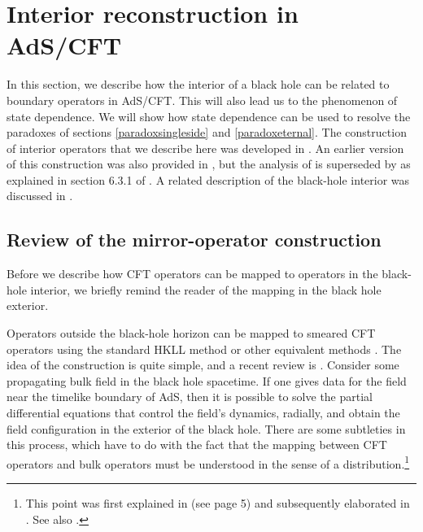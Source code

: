 \documentclass[12pt]{article}
\begin{document}
\section{Interior reconstruction in AdS/CFT \label{secstatedep}}
In this section, we describe how the interior of a black hole can be related to boundary operators in AdS/CFT. This will also lead us to the phenomenon of state dependence. We will show how state dependence can be used
to resolve the paradoxes of sections \ref{paradoxsingleside} and \ref{paradoxeternal}.  The construction of interior operators that we describe here was developed in \cite{Papadodimas:2013wnh,Papadodimas:2013jku,Papadodimas:2015jra}. An earlier version of this construction was also provided in \cite{Papadodimas:2012aq}, but the analysis of \cite{Papadodimas:2012aq} is superseded by \cite{Papadodimas:2013jku} as explained in section 6.3.1 of \cite{Papadodimas:2013jku}. A related description of the black-hole interior was discussed in \cite{Verlinde:2013uja,Verlinde:2013qya,Verlinde:2012cy}.

\subsection{Review of the  mirror-operator construction \label{mirroropreview}}
Before we describe how CFT operators can be mapped to operators in the black-hole interior, we briefly remind the reader of the mapping in the black hole exterior.

Operators outside the black-hole horizon can be mapped to smeared CFT operators \cite{Bena:1999jv} using the standard HKLL method \cite{Hamilton:2007wj,Hamilton:2006fh,Hamilton:2005ju,Hamilton:2006az} or other equivalent methods \cite{Koch:2010cy,Jevicki:2015sla}. The idea of the construction is quite simple, and a recent review is  \cite{Kajuri:2020vxf}. Consider some propagating bulk field in the black hole spacetime. If one gives data for the field near the timelike boundary of AdS, then it is possible to solve the partial differential equations that control the field's dynamics, radially, and obtain the field configuration in the exterior of the black hole.  There are some subtleties in this process, which have to do with the fact that the mapping between CFT operators and bulk operators must be understood in the sense of a distribution.\footnote{This point was first explained in \cite{Papadodimas:2013jku} (see page 5) and subsequently elaborated in \cite{Morrison:2014jha}. See also \cite{Banerjee:2019kjh}.}
\end{document}
